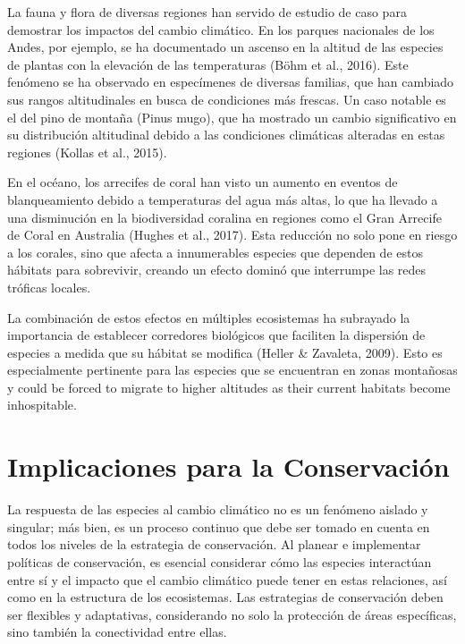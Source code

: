 \documentclass[
  letterpaper,
  DIV=11,
  numbers=noendperiod,
  oneside]{scrreprt}
\begin{document}
La fauna y flora de diversas regiones han servido de estudio de caso
para demostrar los impactos del cambio climático. En los parques
nacionales de los Andes, por ejemplo, se ha documentado un ascenso en la
altitud de las especies de plantas con la elevación de las temperaturas
(Böhm et al., 2016). Este fenómeno se ha observado en especímenes de
diversas familias, que han cambiado sus rangos altitudinales en busca de
condiciones más frescas. Un caso notable es el del pino de montaña
(Pinus mugo), que ha mostrado un cambio significativo en su distribución
altitudinal debido a las condiciones climáticas alteradas en estas
regiones (Kollas et al., 2015).

En el océano, los arrecifes de coral han visto un aumento en eventos de
blanqueamiento debido a temperaturas del agua más altas, lo que ha
llevado a una disminución en la biodiversidad coralina en regiones como
el Gran Arrecife de Coral en Australia (Hughes et al., 2017). Esta
reducción no solo pone en riesgo a los corales, sino que afecta a
innumerables especies que dependen de estos hábitats para sobrevivir,
creando un efecto dominó que interrumpe las redes tróficas locales.

La combinación de estos efectos en múltiples ecosistemas ha subrayado la
importancia de establecer corredores biológicos que faciliten la
dispersión de especies a medida que su hábitat se modifica (Heller \&
Zavaleta, 2009). Esto es especialmente pertinente para las especies que
se encuentran en zonas montañosas y could be forced to migrate to higher
altitudes as their current habitats become inhospitable.

\section{Implicaciones para la
Conservación}\label{implicaciones-para-la-conservaciuxf3n-4}

La respuesta de las especies al cambio climático no es un fenómeno
aislado y singular; más bien, es un proceso continuo que debe ser tomado
en cuenta en todos los niveles de la estrategia de conservación. Al
planear e implementar políticas de conservación, es esencial considerar
cómo las especies interactúan entre sí y el impacto que el cambio
climático puede tener en estas relaciones, así como en la estructura de
los ecosistemas. Las estrategias de conservación deben ser flexibles y
adaptativas, considerando no solo la protección de áreas específicas,
sino también la conectividad entre ellas.
\end{document}
